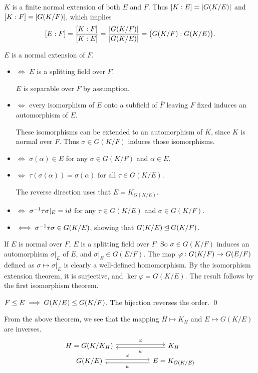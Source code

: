  \(K\) is a finite normal extension of both \(E\) and \(F\). Thus \([K : E] = \left| G(K/E) \right|\) and \([K : F] = \left| G(K/F) \right|\), which implies
\[
    [E : F] = \frac{[K : F]}{[K : E]} = \frac{\left| G(K/F) \right|}{\left| G(K/E) \right|} = \bigl(G(K/F) : G(K/E)\bigr).
\]

 \(E\) is a normal extension of \(F\).
\begin{itemize}
    \item[] \hspace{-20pt} \(\iff\) \(E\) is a splitting field over \(F\).

        \(E\) is separable over \(F\) by assumption.

    \item[] \hspace{-20pt} \(\iff\) every isomorphism of \(E\) onto a subfield of \(\bar{F}\) leaving \(F\) fixed induces an automorphism of \(E\).

        These isomorphisms can be extended to an automorphism of \(K\), since \(K\) is normal over \(F\). Thus \(\sigma \in G(K/F)\) induces those isomorphisms.

    \item[] \hspace{-20pt} \(\iff\) \(\sigma(\alpha) \in E\) for any \(\sigma \in G(K/F)\) and \(\alpha \in E\).

    \item[] \hspace{-20pt} \(\iff\) \(\tau(\sigma(\alpha)) = \sigma(\alpha)\) for all \(\tau \in G(K/E)\).

        The reverse direction uses that \(E = K_{G(K/E)}\).

    \item[] \hspace{-20pt} \(\iff\) \(\sigma^{-1}\tau\sigma|_E = id\) for any \(\tau \in G(K/E)\) and \(\sigma \in G(K/F)\).

    \item[] \hspace{-20pt} \(\iff \sigma^{-1}\tau\sigma \in G(K/E)\), showing that \(G(K/E) \unlhd G(K/F)\).
\end{itemize}

If \(E\) is normal over \(F\), \(E\) is a splitting field over \(F\). So \(\sigma \in G(K/F)\) induces an automorphism \(\sigma|_E\) of \(E\), and \(\sigma |_E \in G(E/F)\). The map \(\varphi : G(K/F) \rightarrow G(E/F)\) defined as \(\sigma \mapsto \sigma|_E\) is clearly a well-defined homomorphism. By the isomorphism extension theorem, it is surjective, and \(\ker\varphi = G(K/E)\). The result follows by the first isomorphism theorem.

 \(F \leq E \implies G(K/E) \leq G(K/F)\). The bijection reverses the order. \qed

From the above theorem, we see that the mapping \(H \mapsto K_H\) and \(E \mapsto G(K/E)\) are inverses.
\[
    \begin{tikzcd}[row sep=tiny, every arrow/.append style={shift left}]
        H = G(K/K_H) \arrow{rr}{\varphi} && K_H \arrow{ll}{\psi} \\
        G(K/E) \arrow{rr}{\varphi} && E = K_{G(K/E)} \arrow{ll}{\psi}
    \end{tikzcd}
\]

\smallskip
